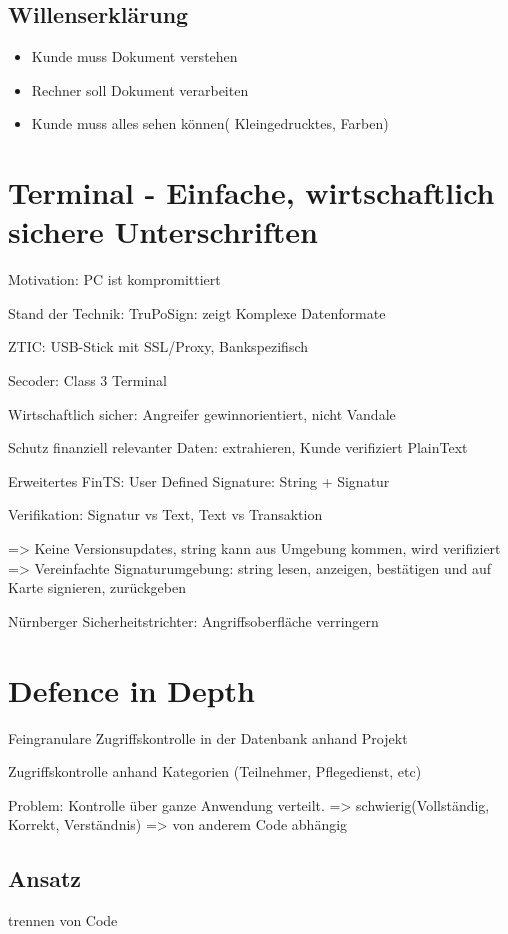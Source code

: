 \subsection*{  Willenserklärung }
\begin{itemize}
	\item Kunde muss Dokument verstehen
	\item Rechner soll Dokument verarbeiten
	\item Kunde muss alles sehen können( Kleingedrucktes, Farben)
\end{itemize}


\section*{Terminal - Einfache, wirtschaftlich sichere Unterschriften}
Motivation: PC ist kompromittiert

Stand der Technik:
TruPoSign: zeigt Komplexe Datenformate

ZTIC: USB-Stick mit SSL/Proxy, Bankspezifisch

Secoder: Class 3 Terminal

Wirtschaftlich sicher: Angreifer gewinnorientiert, nicht Vandale

Schutz finanziell relevanter Daten: extrahieren, Kunde verifiziert PlainText

Erweitertes FinTS: User Defined Signature: String + Signatur

Verifikation: Signatur vs Text, Text vs Transaktion

=> Keine Versionsupdates, string kann aus Umgebung kommen, wird verifiziert
=> Vereinfachte Signaturumgebung: string lesen, anzeigen, bestätigen und auf Karte signieren, zurückgeben

Nürnberger Sicherheitstrichter: Angriffsoberfläche verringern



\section*{Defence in Depth}
Feingranulare Zugriffskontrolle in der Datenbank anhand Projekt

Zugriffskontrolle anhand Kategorien (Teilnehmer, Pflegedienst, etc)

Problem: Kontrolle über ganze Anwendung verteilt.
=> schwierig(Vollständig, Korrekt, Verständnis)
=> von anderem Code abhängig

\subsection*{Ansatz} trennen von Code

